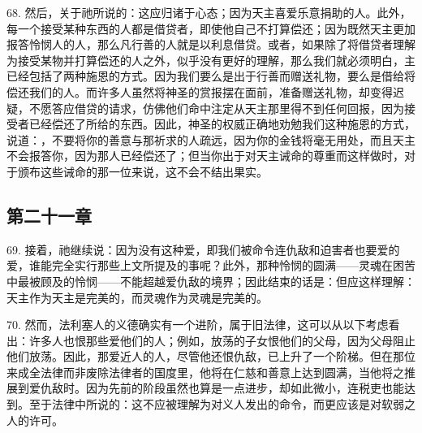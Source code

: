 68. 然后，关于祂所说的：这应归诸于心态；因为天主喜爱乐意捐助的人。此外，每一个接受某种东西的人都是借贷者，即使他自己不打算偿还；因为既然天主更加报答怜悯人的人，那么凡行善的人就是以利息借贷。或者，如果除了将借贷者理解为接受某物并打算偿还的人之外，似乎没有更好的理解，那么我们就必须明白，主已经包括了两种施恩的方式。因为我们要么是出于行善而赠送礼物，要么是借给将偿还我们的人。而许多人虽然将神圣的赏报摆在面前，准备赠送礼物，却变得迟疑，不愿答应借贷的请求，仿佛他们命中注定从天主那里得不到任何回报，因为接受者已经偿还了所给的东西。因此，神圣的权威正确地劝勉我们这种施恩的方式，说道：，不要将你的善意与那祈求的人疏远，因为你的金钱将毫无用处，而且天主不会报答你，因为那人已经偿还了；但当你出于对天主诫命的尊重而这样做时，对于颁布这些诫命的那一位来说，这不会不结出果实。\par


\subsection{第二十一章}

69. 接着，祂继续说：因为没有这种爱，即我们被命令连仇敌和迫害者也要爱的爱，谁能完全实行那些上文所提及的事呢？此外，那种怜悯的圆满——灵魂在困苦中最被顾及的怜悯——不能超越爱仇敌的境界；因此结束的话是：但应这样理解：天主作为天主是完美的，而灵魂作为灵魂是完美的。\par

70. 然而，法利塞人的义德确实有一个进阶，属于旧法律，这可以从以下考虑看出：许多人也恨那些爱他们的人；例如，放荡的子女恨他们的父母，因为父母阻止他们放荡。因此，那爱近人的人，尽管他还恨仇敌，已上升了一个阶梯。但在那位来成全法律而非废除法律者的国度里，他将在仁慈和善意上达到圆满，当他将之推展到爱仇敌时。因为先前的阶段虽然也算是一点进步，却如此微小，连税吏也能达到。至于法律中所说的：这不应被理解为对义人发出的命令，而更应该是对软弱之人的许可。\par

